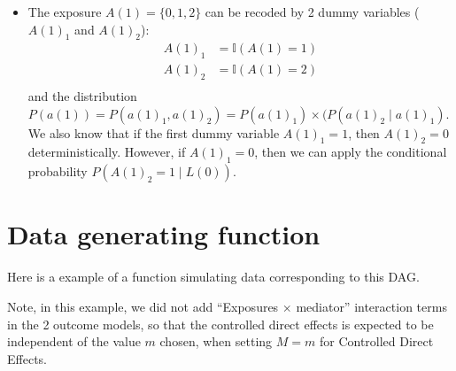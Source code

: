 \documentclass[
]{book}
\providecommand{\tightlist}{%
  \setlength{\itemsep}{0pt}\setlength{\parskip}{0pt}}
\begin{document}
\begin{itemize}
\tightlist
\item
  The exposure \(A(1)= \{0,1,2\}\) can be recoded by 2 dummy variables (\(A(1)_1\) and \(A(1)_2\)):
  \begin{align*}
  A(1)_1 &= \mathbb{I}(A(1) = 1) \\
  A(1)_2 &= \mathbb{I}(A(1) = 2) \\
    \end{align*}
  and the distribution \(P(a(1)) = P(a(1)_1, a(1)_2) = P(a(1)_1) \times (P(a(1)_2 \mid a(1)_1)\). We also know that if the first dummy variable \(A(1)_1 = 1\), then \(A(1)_2 = 0\) deterministically. However, if \(A(1)_1 = 0\), then we can apply the conditional probability \(P(A(1)_2 = 1 \mid L(0))\).
\end{itemize}

\section{Data generating function}\label{data-generating-function}

Here is a example of a function simulating data corresponding to this DAG.

Note, in this example, we did not add ``Exposures \(\times\) mediator'' interaction terms in the 2 outcome models, so that the controlled direct effects is expected to be independent of the value \(m\) chosen, when setting \(M=m\) for Controlled Direct Effects.
\end{document}

